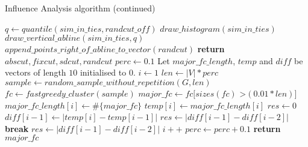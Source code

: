 \documentclass[a4paper]{article}
\begin{document}
\begin{algorithm}
\ContinuedFloat
\caption{Influence Analysis algorithm (continued)}
\begin{algorithmic}[1]
        \State $q \gets quantile(sim\_in\_ties, randcut\_off)$
        \State $draw\_histogram(sim\_in\_ties)$
        \State $draw\_vertical\_abline(sim\_in\_ties, q)$
        \State $append\_points\_right\_of\_abline\_to\_vector(randcut)$
    \EndFor \label{ia_clusterendfor}
    \State \textbf{return} $abscut, fixcut, sdcut, randcut$
\EndProcedure
\Statex
{}
    \State $perc \gets 0.1$
    \State Let $major\_fc\_length$, $temp$ and $diff$ be vectors of length $10$ initialised to $0$.
    \State $i \gets 1$
        \State $len \gets |V| * perc$
        \State $sample \gets random\_sample\_without\_repetition(G, len)$
        \State $fc \gets fastgreedy\_cluster(sample)$
        \State $major\_fc \gets fc[sizes(fc)$ \textgreater $(0.01 * len)]$
        \State $major\_fc\_length[i] \gets \#\{major\_fc\}$
        \State $temp[i] \gets major\_fc\_length[i]$
        \State $res \gets 0$
            \State $diff[i - 1] \gets |temp[i] - temp[i - 1]|$
                    \State $res \gets |diff[i - 1] - diff[i - 2]|$
                    \State \textbf{break}
                \Else
                    \State $res \gets |diff[i - 1] - diff[i - 2]|$ 
                \EndIf \label{ia_resendif}
            \EndIf \label{ia_ig2endif}
        \EndIf \label{ia_ig1endif}
        \State $i++$
        \State $perc \gets perc + 0.1$
    \EndWhile \label{ia_percendwhile} 
    \State \textbf{return} $major\_fc$ 
\EndProcedure 
{}
\end{algorithmic}
\end{algorithm}
\end{document}
